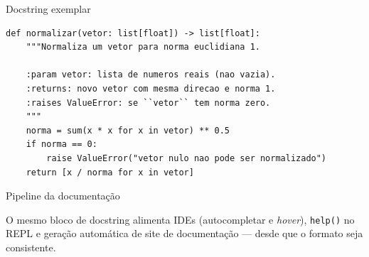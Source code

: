 \documentclass[aspectratio=169]{beamer}
\begin{document}
\begin{frame}[fragile]{Docstring exemplar}
\begin{lstlisting}
def normalizar(vetor: list[float]) -> list[float]:
    """Normaliza um vetor para norma euclidiana 1.

    :param vetor: lista de numeros reais (nao vazia).
    :returns: novo vetor com mesma direcao e norma 1.
    :raises ValueError: se ``vetor`` tem norma zero.
    """
    norma = sum(x * x for x in vetor) ** 0.5
    if norma == 0:
        raise ValueError("vetor nulo nao pode ser normalizado")
    return [x / norma for x in vetor]
\end{lstlisting}
\end{frame}

\begin{frame}{Pipeline da documentação}
  \begin{center}
  \end{center}
  \vspace{0.5em}
  \footnotesize O mesmo bloco de docstring alimenta IDEs (autocompletar e
  \emph{hover}), \texttt{help()} no REPL e geração automática de site de
  documentação --- desde que o formato seja consistente.
\end{frame}
\end{document}
